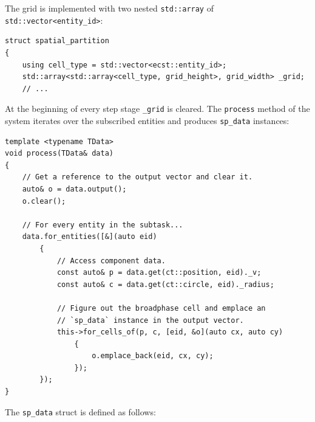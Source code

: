 \documentclass[twoside, 12pt, a4paper, openany]{book}
\begin{document}
The grid is implemented with two nested
\texttt{std::array}
of
\texttt{std::vector<entity_id>}:

\begin{verbatim}
struct spatial_partition
{
    using cell_type = std::vector<ecst::entity_id>;
    std::array<std::array<cell_type, grid_height>, grid_width> _grid;
    // ...
\end{verbatim}

At the beginning of every step stage
\texttt{_grid}
is cleared. The
\texttt{process}
method of the system iterates over the subscribed entities and produces
\texttt{sp_data}
instances:

\begin{verbatim}
template <typename TData>
void process(TData& data)
{
    // Get a reference to the output vector and clear it.
    auto& o = data.output();
    o.clear();

    // For every entity in the subtask...
    data.for_entities([&](auto eid)
        {
            // Access component data.
            const auto& p = data.get(ct::position, eid)._v;
            const auto& c = data.get(ct::circle, eid)._radius;

            // Figure out the broadphase cell and emplace an
            // `sp_data` instance in the output vector.
            this->for_cells_of(p, c, [eid, &o](auto cx, auto cy)
                {
                    o.emplace_back(eid, cx, cy);
                });
        });
}
\end{verbatim}

The
\texttt{sp_data}
struct is defined as follows:
\end{document}
